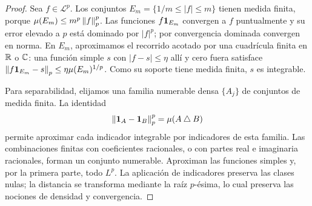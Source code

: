 \begin{proof}
Sea $f\in\mathcal L^p$. Los conjuntos $E_m=\{1/m\le|f|\le m\}$ tienen medida finita, porque $\mu(E_m)\le m^p\left\lVert f\right\rVert_p^p$. Las funciones $f\mathbf1_{E_m}$ convergen a $f$ puntualmente y su error elevado a $p$ está dominado por $|f|^p$; por convergencia dominada convergen en norma. En $E_m$, aproximamos el recorrido acotado por una cuadrícula finita en $\mathbb R$ o $\mathbb C$: una función simple $s$ con $|f-s|\le\eta$ allí y cero fuera satisface $\left\lVert f\mathbf1_{E_m}-s\right\rVert_p\le\eta\mu(E_m)^{1/p}$. Como su soporte tiene medida finita, $s$ es integrable.

Para separabilidad, elijamos una familia numerable densa $\{A_j\}$ de conjuntos de medida finita. La identidad
\[
 \left\lVert\mathbf1_{A}-\mathbf1_{B}\right\rVert_p^p=\mu(A\mathbin\triangle B)
\]
permite aproximar cada indicador integrable por indicadores de esta familia. Las combinaciones finitas con coeficientes racionales, o con partes real e imaginaria racionales, forman un conjunto numerable. Aproximan las funciones simples y, por la primera parte, todo $L^p$. La aplicación de indicadores preserva las clases nulas; la distancia se transforma mediante la raíz $p$-ésima, lo cual preserva las nociones de densidad y convergencia.
\end{proof}

